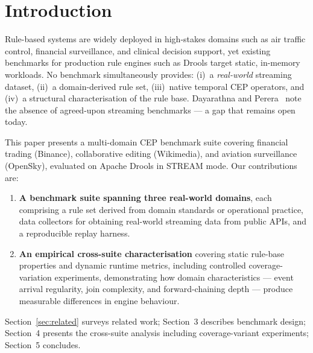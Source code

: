 

\section{Introduction}\label{sec:intro}

Rule-based systems are widely deployed in high-stakes domains such as air traffic control, financial surveillance, and clinical decision support, yet existing benchmarks for production rule engines such as Drools target static, in-memory workloads. No benchmark simultaneously provides: (i)~a \emph{real-world} streaming dataset, (ii)~a domain-derived rule set, (iii)~native temporal CEP operators, and (iv)~a structural characterisation of the rule base. Dayarathna and Perera~\cite{dayarathna2018event} note the absence of agreed-upon streaming benchmarks --- a gap that remains open today.

This paper presents a multi-domain CEP benchmark suite covering financial trading (Binance), collaborative editing (Wikimedia), and aviation surveillance (OpenSky), evaluated on Apache Drools in STREAM mode. Our contributions are:

\begin{enumerate}
  \item \textbf{A benchmark suite spanning three real-world domains}, each comprising a rule set derived from domain standards or operational practice, data collectors for obtaining real-world streaming data from public APIs, and a reproducible replay harness.
  \item \textbf{An empirical cross-suite characterisation} covering static rule-base properties and dynamic runtime metrics, including controlled coverage-variation experiments, demonstrating how domain characteristics --- event arrival regularity, join complexity, and forward-chaining depth --- produce measurable differences in engine behaviour.
\end{enumerate}

Section~\ref{sec:related} surveys related work; Section~3 describes benchmark design; Section~4 presents the cross-suite analysis including coverage-variant experiments; Section~5 concludes.


